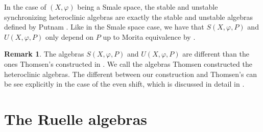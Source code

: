 \documentclass{amsart}
\theoremstyle{plain}
\theoremstyle{definition}
\newtheorem{remark}[theorem]{Remark}
\theoremstyle{remark}
\begin{document}
In the case of $(X,\varphi)$ being a Smale space, the stable and unstable synchronizing heteroclinic algebras are exactly the stable and unstable algebras defined by Putnam \cite{putnam99}. Like in the Smale space case, we have that $S(X,\varphi,P)$ and $U(X, \varphi,P)$ only depend on $P$ up to Morita equivalence by \cite[Theorem 5.5]{DeeSto}.

\begin{remark} \label{rem:differentalgebras}
The algebras $S(X,\varphi,P)$ and $U(X, \varphi, P)$ are different than the ones Thomsen's constructed in \cite{thomsen2010c}. We call the algebras Thomsen constructed the heteroclinic algebras. The different between our construction and Thomsen's can be see explicitly in the case of the even shift, which is discussed in detail in \cite[Section 5]{DeeStoShift}.
\end{remark}

\section{The Ruelle algebras} \label{sec:Ruelle}
\end{document}

